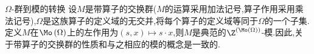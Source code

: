 \begin{example}{$\Omega$-群到模的转换}{}
	设$M$是带算子的交换群($M$的运算采用加法记号,算子作用采用乘法记号),$\Omega$是这族算子的定义域的无交并,将每个算子的定义域等同于$\Omega$的一个子集.定义$M$在$\Mo\left(\Omega\right)$上的左作用为$\left(s,x\right)\mapsto s\cdot x$,则$M$是典范的$\Z^{\left(\Mo\left(\Omega\right)\right)}$-模.因此,关于带算子的交换群的性质和与之相应的模的概念是一致的.
\end{example}












































